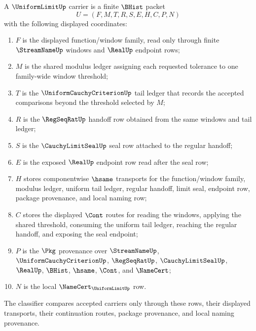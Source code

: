 \begin{definition}
\label{def:uniform-limit-carrier}
A $\UniformLimitUp$ carrier is a finite $\BHist$ packet
$$
U=(F,M,T,R,S,E,H,C,P,N)
$$
with the following displayed coordinates:
\begin{enumerate}
\item $F$ is the displayed function/window family, read only through finite $\StreamNameUp$ windows and $\RealUp$ endpoint rows;
\item $M$ is the shared modulus ledger assigning each requested tolerance to one family-wide window threshold;
\item $T$ is the $\UniformCauchyCriterionUp$ tail ledger that records the accepted comparisons beyond the threshold selected by $M$;
\item $R$ is the $\RegSeqRatUp$ handoff row obtained from the same windows and tail ledger;
\item $S$ is the $\CauchyLimitSealUp$ seal row attached to the regular handoff;
\item $E$ is the exposed $\RealUp$ endpoint row read after the seal row;
\item $H$ stores componentwise $\hsame$ transports for the function/window family, modulus ledger, uniform tail ledger, regular handoff, limit seal, endpoint row, package provenance, and local naming row;
\item $C$ stores the displayed $\Cont$ routes for reading the windows, applying the shared threshold, consuming the uniform tail ledger, reaching the regular handoff, and exposing the seal endpoint;
\item $P$ is the $\Pkg$ provenance over $\StreamNameUp$, $\UniformCauchyCriterionUp$, $\RegSeqRatUp$, $\CauchyLimitSealUp$, $\RealUp$, $\BHist$, $\hsame$, $\Cont$, and $\NameCert$;
\item $N$ is the local $\NameCert_{\UniformLimitUp}$ row.
\end{enumerate}
The classifier compares accepted carriers only through these rows, their displayed transports, their continuation routes, package provenance, and local naming provenance.
\end{definition}

